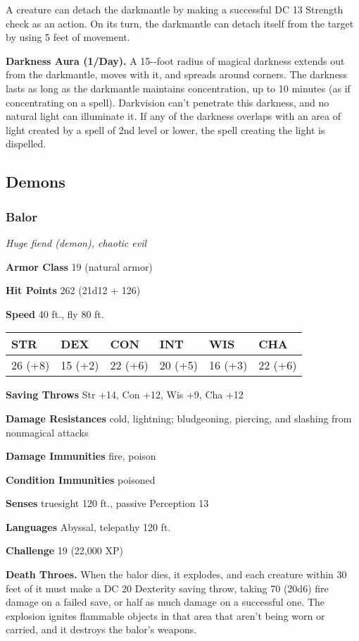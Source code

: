 \documentclass[
]{article}
\begin{document}
A creature can detach the darkmantle by making a successful DC 13
Strength check as an action. On its turn, the darkmantle can detach
itself from the target by using 5 feet of movement.

\textbf{Darkness Aura (1/Day).} A 15-­‐foot radius of magical darkness
extends out from the darkmantle, moves with it, and spreads around
corners. The darkness lasts as long as the darkmantle maintains
concentration, up to 10 minutes (as if concentrating on a spell).
Darkvision can't penetrate this darkness, and no natural light can
illuminate it. If any of the darkness overlaps with an area of light
created by a spell of 2nd level or lower, the spell creating the light
is dispelled.

\hypertarget{demons}{%
\subsection{Demons}\label{demons}}

\hypertarget{balor}{%
\subsubsection{Balor}\label{balor}}

\emph{Huge fiend (demon), chaotic evil}

\textbf{Armor Class} 19 (natural armor)

\textbf{Hit Points} 262 (21d12 + 126)

\textbf{Speed} 40 ft., fly 80 ft.

\begin{longtable}[]{@{}llllll@{}}
\toprule
STR & DEX & CON & INT & WIS & CHA\tabularnewline
\midrule
\endhead
26 (+8) & 15 (+2) & 22 (+6) & 20 (+5) & 16 (+3) & 22 (+6)\tabularnewline
\bottomrule
\end{longtable}

\textbf{Saving Throws} Str +14, Con +12, Wis +9, Cha +12

\textbf{Damage Resistances} cold, lightning; bludgeoning, piercing, and
slashing from nonmagical attacks

\textbf{Damage Immunities} fire, poison

\textbf{Condition Immunities} poisoned

\textbf{Senses} truesight 120 ft., passive Perception 13

\textbf{Languages} Abyssal, telepathy 120 ft.

\textbf{Challenge} 19 (22,000 XP)

\textbf{Death Throes.} When the balor dies, it explodes, and each
creature within 30 feet of it must make a DC 20 Dexterity saving throw,
taking 70 (20d6) fire damage on a failed save, or half as much damage on
a successful one. The explosion ignites flammable objects in that area
that aren't being worn or carried, and it destroys the balor's weapons.
\end{document}
